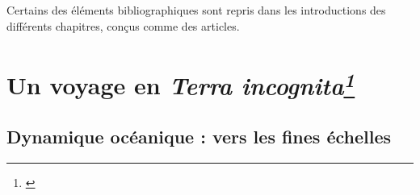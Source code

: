 

Certains des éléments bibliographiques sont repris dans les introductions des différents chapitres, conçus comme des articles.

\section[Un voyage en \textit{Terra incognita}]{Un voyage en \textit{Terra incognita\footnote{\cite{scotti_large_2010}}}}
\subsection{Dynamique océanique : vers les fines échelles}
\label{subsection_intro1}

